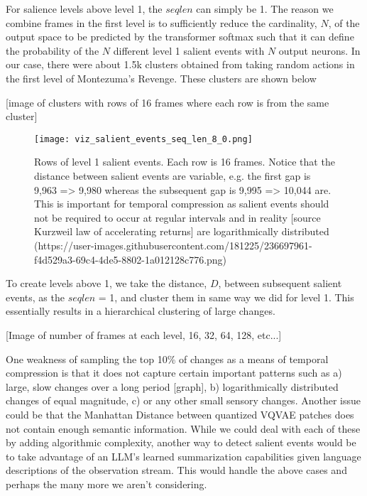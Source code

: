 \documentclass{article}
\begin{document}
For salience levels above level 1, the $seqlen$ can simply be 1. The reason we combine frames in the first level is to sufficiently reduce the cardinality, $N$, of the output space to be predicted by the transformer softmax such that it can define the probability of the $N$ different level 1 salient events with $N$ output neurons. In our case, there were about 1.5k clusters obtained from taking random actions in the first level of Montezuma's Revenge. These clusters are shown below

[image of clusters with rows of 16 frames where each row is from the same cluster]
\begin{figure}
    \centering
    \texttt{[image: viz\_salient\_events\_seq\_len\_8\_0.png]}
    \caption{Rows of level 1 salient events. Each row is 16 frames. Notice that the distance between salient events are variable, e.g. the first gap is 9,963 => 9,980 whereas the subsequent gap is 9,995 => 10,044 are. This is important for temporal compression as salient events should not be required to occur at regular intervals and in reality [source Kurzweil law of accelerating returns] are logarithmically distributed (https://user-images.githubusercontent.com/181225/236697961-f4d529a3-69c4-4de5-8802-1a012128c776.png)}
    \label{fig:my_label}
\end{figure}

To create levels above 1, we take the distance, $D$, between subsequent salient events, as the $seqlen$ = 1, and cluster them in same way we did for level 1. This essentially results in a hierarchical clustering of large changes.

[Image of number of frames at each level, 16, 32, 64, 128, etc...]

One weakness of sampling the top 10\% of changes as a means of temporal compression is that it does not capture certain important patterns such as a) large, slow changes over a long period [graph], b) logarithmically distributed changes of equal magnitude, c) or any other small sensory changes. Another issue could be that the Manhattan Distance between quantized VQVAE patches does not contain enough semantic information. While we could deal with each of these by adding algorithmic complexity, another way to detect salient events would be to take advantage of an LLM's learned summarization capabilities given language descriptions of the observation stream. This would handle the above cases and perhaps the many more we aren't considering.
\end{document}
